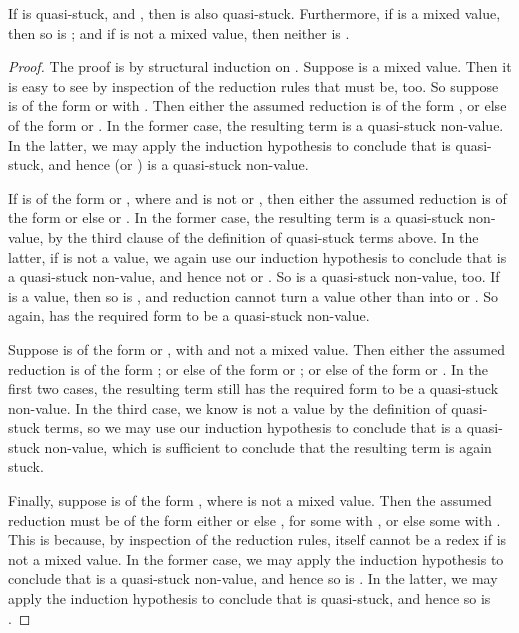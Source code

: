 \documentclass{LMCS}
\begin{document}
\begin{lem}
\label{lem:redqs}
If  is quasi-stuck, and , then  is also quasi-stuck.
Furthermore, if  is a mixed value, then so is ; and if  is
not a mixed value, then neither is .
\end{lem}
\begin{proof}
The proof is by structural induction on
.  Suppose  is a mixed value.  Then it is easy to see by
inspection of the reduction rules that  must be, too.  So suppose
 is of the form  or  with .  Then either the
assumed reduction is of the form , or else of the form
 or .  In the former case, the
resulting term is a quasi-stuck non-value.  In the latter, we may
apply the induction hypothesis to conclude that  is quasi-stuck,
and hence  (or ) is a quasi-stuck non-value.

If  is of the form  or , where  and 
is not  or , then either the assumed reduction is of the form
 or else  or .  In the former case, the resulting term is
a quasi-stuck non-value, by the third clause of the definition of
quasi-stuck terms above.  In the latter, if  is not a value, we
again use our induction hypothesis to conclude that  is a
quasi-stuck non-value, and hence not  or .  So  is a
quasi-stuck non-value, too.  If  is a value, then so is , and
reduction cannot turn a value other than  into  or .  So
again,  has the required form to be a quasi-stuck non-value.

Suppose  is of the form  or ,
with  and  not a mixed value.  Then either the assumed
reduction is of the form ; or else of the form  or ; or
else of the form 
or .  In the first two cases, the
resulting term still has the required form to be a quasi-stuck
non-value.  In the third case, we know  is not a value by the
definition of quasi-stuck terms, so we may use our induction
hypothesis to conclude that  is a quasi-stuck non-value, which
is sufficient to conclude that the resulting term is again stuck.

Finally, suppose  is of the form , where  is not a
mixed value.  Then the assumed reduction must be of the form either
 or else , for some
 with , or else some  with .  This is because, by inspection of the reduction rules, 
itself cannot be a redex if  is not a mixed value.  In the former
case, we may apply the induction hypothesis to conclude that 
is a quasi-stuck non-value, and hence so is .  In the latter,
we may apply the induction hypothesis to conclude that  is quasi-stuck,
and hence so is . 
\end{proof}
\end{document}
